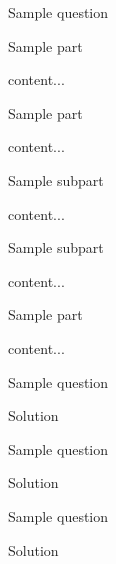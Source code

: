 \documentclass[12pt]{article} %
\begin{document}
	\renewcommand*{\term}{Season 2000} %
	\renewcommand*{\coursecode}{MATH xxx} %
	\renewcommand*{\coursename}{Mathematics Course} %
	\renewcommand*{\assgnnumber}{Assignment \#00} %
	\renewcommand*{\assgnurl}{\url{}}
	\renewcommand*{\studentfname}{FName} %
	\renewcommand*{\studentlname}{LName} %
	\renewcommand*{\studentnum}{SNumber} %
	\renewcommand*{\profname}{ProfFName ProfLName} %
	\renewcommand*{\submdate}{00 MONTH 201x} %
	\renewcommand*{\coursesection}{Section 00: 00:00 a.m.} %
	\setfigpath
	\doublespacing
	\insertpictitle
	\pagestyle{printedassignment}
\begin{qstn}[1][][]%
	Sample question
\begin{assgnenum}
	\qitem Sample part
	\begin{soln}
		content...
	\end{soln}
	\qitem Sample part
	\begin{soln}
		content...
	\end{soln}
	\begin{assgnenum}
		\qitem Sample subpart
		\begin{soln}
			content...
		\end{soln}
		\qitem Sample subpart
		\begin{soln}
			content...
		\end{soln}
	\end{assgnenum}
	\qitem Sample part
	\begin{soln}
		content...
	\end{soln}
\end{assgnenum}
\end{qstn}

\begin{qstn}[2][][]
	Sample question
\begin{soln}
	Solution
\end{soln}
\end{qstn}

\begin{qstn}[3][][]
	Sample question
\begin{soln}
	Solution
\end{soln}
\end{qstn}

\begin{qstn}[4][][]
	Sample question
\begin{soln}
	Solution
\end{soln}
\end{qstn}
\end{document}
